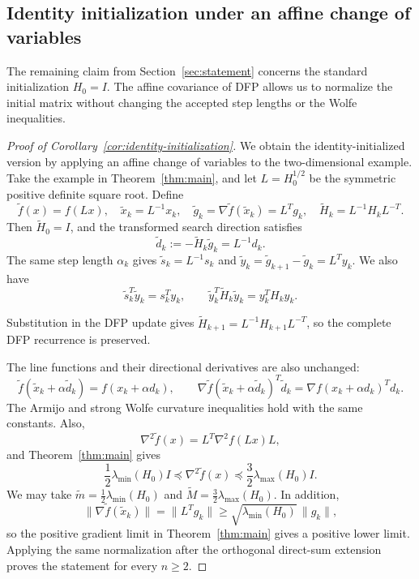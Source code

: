 \documentclass[11pt]{article}
\begin{document}
\subsection{Identity initialization under an affine change of variables}

The remaining claim from Section~\ref{sec:statement} concerns the standard
initialization $H_0=I$.  The affine covariance of DFP allows us to normalize
the initial matrix without changing the accepted step lengths or the Wolfe
inequalities.

\begin{proof}[Proof of Corollary~\ref{cor:identity-initialization}]
We obtain the identity-initialized version by applying an affine change of
variables to the two-dimensional example.  Take the example in
Theorem~\ref{thm:main}, and let
$L=H_0^{1/2}$ be the symmetric positive definite square root.  Define
\[
\widetilde f(x)=f(Lx),\quad \widetilde x_k=L^{-1}x_k,\quad
\widetilde g_k=\nabla\widetilde f(\widetilde x_k)=L^Tg_k,\quad
\widetilde H_k=L^{-1}H_kL^{-T}.
\]
Then $\widetilde H_0=I$, and the transformed search direction satisfies
\[
\widetilde d_k:=-\widetilde H_k\widetilde g_k
=L^{-1}d_k.
\]
The same step length $\alpha_k$ gives
$\widetilde s_k=L^{-1}s_k$ and
$\widetilde y_k=\widetilde g_{k+1}-\widetilde g_k=L^Ty_k$.  We also have
\[
\widetilde s_k^T\widetilde y_k=s_k^Ty_k,
\qquad
\widetilde y_k^T\widetilde H_k\widetilde y_k=y_k^TH_ky_k.
\]

Substitution in the DFP update gives
$\widetilde H_{k+1}=L^{-1}H_{k+1}L^{-T}$, so the complete DFP recurrence is
preserved.

The line functions and their directional derivatives are also unchanged:
\[
\widetilde f(\widetilde x_k+\alpha\widetilde d_k)
=f(x_k+\alpha d_k),\qquad
\nabla\widetilde f(\widetilde x_k+\alpha\widetilde d_k)^T\widetilde d_k
=\nabla f(x_k+\alpha d_k)^Td_k.
\]
The Armijo and strong Wolfe curvature inequalities hold with the same
constants.  Also,
\[
\nabla^2\widetilde f(x)=L^T\nabla^2f(Lx)L,
\]
and Theorem~\ref{thm:main} gives
\[
\frac12\lambda_{\min}(H_0)I
\preceq\nabla^2\widetilde f(x)
\preceq\frac32\lambda_{\max}(H_0)I.
\]
We may take
$\widetilde m=\frac12\lambda_{\min}(H_0)$ and
$\widetilde M=\frac32\lambda_{\max}(H_0)$.  In addition,
\[
\|\nabla\widetilde f(\widetilde x_k)\|=\|L^Tg_k\|
\ge \sqrt{\lambda_{\min}(H_0)}\,\|g_k\|,
\]
so the positive gradient limit in Theorem~\ref{thm:main} gives a positive
lower limit.  Applying the same normalization after the orthogonal
direct-sum extension proves the statement for every $n\ge2$.

\end{proof}
\end{document}
